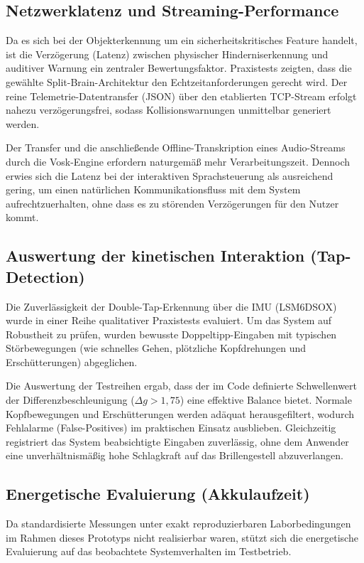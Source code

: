 \subsection{Netzwerklatenz und Streaming-Performance}
Da es sich bei der Objekterkennung um ein sicherheitskritisches Feature handelt, ist die Verzögerung (Latenz) zwischen physischer Hinderniserkennung und auditiver Warnung ein zentraler Bewertungsfaktor. Praxistests zeigten, dass die gewählte \glqq Split-Brain\grqq-Architektur den Echtzeitanforderungen gerecht wird. Der reine Telemetrie-Datentransfer (JSON) über den etablierten TCP-Stream erfolgt nahezu verzögerungsfrei, sodass Kollisionswarnungen unmittelbar generiert werden. 

Der Transfer und die anschließende Offline-Transkription eines Audio-Streams durch die Vosk-Engine erfordern naturgemäß mehr Verarbeitungszeit. Dennoch erwies sich die Latenz bei der interaktiven Sprachsteuerung als ausreichend gering, um einen natürlichen Kommunikationsfluss mit dem System aufrechtzuerhalten, ohne dass es zu störenden Verzögerungen für den Nutzer kommt.

\subsection{Auswertung der kinetischen Interaktion (Tap-Detection)}
Die Zuverlässigkeit der Double-Tap-Erkennung über die IMU (LSM6DSOX) wurde in einer Reihe qualitativer Praxistests evaluiert. Um das System auf Robustheit zu prüfen, wurden bewusste Doppeltipp-Eingaben mit typischen Störbewegungen (wie schnelles Gehen, plötzliche Kopfdrehungen und Erschütterungen) abgeglichen.

Die Auswertung der Testreihen ergab, dass der im Code definierte Schwellenwert der Differenzbeschleunigung ($\Delta g > 1,75$) eine effektive Balance bietet. Normale Kopfbewegungen und Erschütterungen werden adäquat herausgefiltert, wodurch Fehlalarme (False-Positives) im praktischen Einsatz ausblieben. Gleichzeitig registriert das System beabsichtigte Eingaben zuverlässig, ohne dem Anwender eine unverhältnismäßig hohe Schlagkraft auf das Brillengestell abzuverlangen.

\subsection{Energetische Evaluierung (Akkulaufzeit)}
Da standardisierte Messungen unter exakt reproduzierbaren Laborbedingungen im Rahmen dieses Prototyps nicht realisierbar waren, stützt sich die energetische Evaluierung auf das beobachtete Systemverhalten im Testbetrieb.

